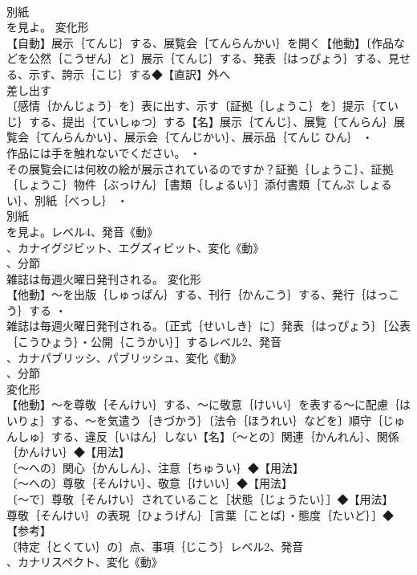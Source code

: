 \documentclass[8pt]{extreport}
\begin{document}
\begin{CJK}{UTF8}{min}
\\	別紙
\\	を見よ。	変化形 
\\	【自動】展示｛てんじ｝する、展覧会｛てんらんかい｝を開く【他動】〔作品などを公然｛こうぜん｝と〕展示｛てんじ｝する、発表｛はっぴょう｝する、見せる、示す、誇示｛こじ｝する◆【直訳】外へ
\\	差し出す
\\	〔感情｛かんじょう｝を〕表に出す、示す〔証拠｛しょうこ｝を〕提示｛ていじ｝する、提出｛ていしゅつ｝する【名】展示｛てんじ｝、展覧｛てんらん｝展覧会｛てんらんかい｝、展示会｛てんじかい｝、展示品｛てんじ ひん｝ ・
\\	作品には手を触れないでください。 ・
\\	その展覧会には何枚の絵が展示されているのですか？証拠｛しょうこ｝、証拠｛しょうこ｝物件｛ぶっけん｝［書類｛しょるい｝］添付書類｛てんぷ しょるい｝、別紙｛べっし｝ ・
\\	別紙
\\	を見よ。レベル4、発音《動》
\\	、カナイグジビット、エグズィビット、変化《動》
\\	、分節
\\	雑誌は毎週火曜日発刊される。	変化形 
\\	【他動】～を出版｛しゅっぱん｝する、刊行｛かんこう｝する、発行｛はっこう｝する ・
\\	雑誌は毎週火曜日発刊される。〔正式｛せいしき｝に〕発表｛はっぴょう｝［公表｛こうひょう｝・公開｛こうかい｝］するレベル2、発音
\\	、カナパブリッシ、パブリッシュ、変化《動》
\\	、分節
\\	変化形 
\\	【他動】～を尊敬｛そんけい｝する、～に敬意｛けいい｝を表する～に配慮｛はいりょ｝する、～を気遣う｛きづかう｝〔法令｛ほうれい｝などを〕順守｛じゅんしゅ｝する、違反｛いはん｝しない【名】〔～との〕関連｛かんれん｝、関係｛かんけい｝◆【用法】
\\	〔～への〕関心｛かんしん｝、注意｛ちゅうい｝◆【用法】
\\	〔～への〕尊敬｛そんけい｝、敬意｛けいい｝◆【用法】
\\	〔～で〕尊敬｛そんけい｝されていること［状態｛じょうたい｝］◆【用法】
\\	尊敬｛そんけい｝の表現｛ひょうげん｝［言葉｛ことば｝・態度｛たいど｝］◆【参考】
\\	〔特定｛とくてい｝の〕点、事項｛じこう｝レベル2、発音
\\	、カナリスペクト、変化《動》

\end{CJK}
\end{document}
